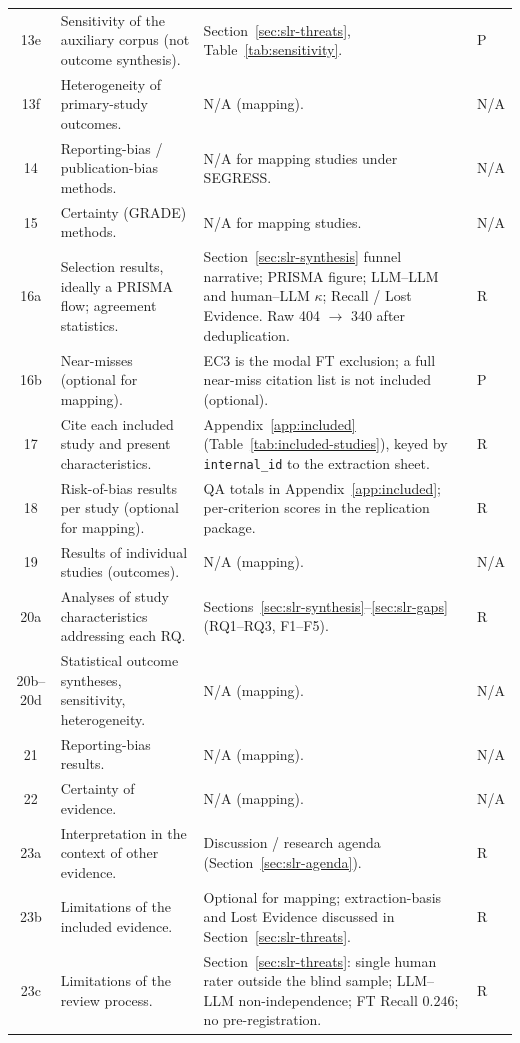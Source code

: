 \begin{longtable}{c p{4.4cm} p{6.6cm} l}
13e & Sensitivity of the auxiliary corpus (not outcome synthesis). & Section~\ref{sec:slr-threats}, Table~\ref{tab:sensitivity}. & P \\
13f & Heterogeneity of primary-study outcomes. & N/A (mapping). & N/A \\
14 & Reporting-bias / publication-bias methods. & N/A for mapping studies under SEGRESS. & N/A \\
15 & Certainty (GRADE) methods. & N/A for mapping studies. & N/A \\
16a & Selection results, ideally a PRISMA flow; agreement statistics. & Section~\ref{sec:slr-synthesis} funnel narrative; PRISMA figure; LLM--LLM and human--LLM $\kappa$; Recall / Lost Evidence. Raw 404 $\rightarrow$ 340 after deduplication. & R \\
16b & Near-misses (optional for mapping). & EC3 is the modal FT exclusion; a full near-miss citation list is not included (optional). & P \\
17 & Cite each included study and present characteristics. & Appendix~\ref{app:included} (Table~\ref{tab:included-studies}), keyed by \texttt{internal\_id} to the extraction sheet. & R \\
18 & Risk-of-bias results per study (optional for mapping). & QA totals in Appendix~\ref{app:included}; per-criterion scores in the replication package. & R \\
19 & Results of individual studies (outcomes). & N/A (mapping). & N/A \\
20a & Analyses of study characteristics addressing each RQ. & Sections~\ref{sec:slr-synthesis}--\ref{sec:slr-gaps} (RQ1--RQ3, F1--F5). & R \\
20b--20d & Statistical outcome syntheses, sensitivity, heterogeneity. & N/A (mapping). & N/A \\
21 & Reporting-bias results. & N/A (mapping). & N/A \\
22 & Certainty of evidence. & N/A (mapping). & N/A \\
23a & Interpretation in the context of other evidence. & Discussion / research agenda (Section~\ref{sec:slr-agenda}). & R \\
23b & Limitations of the included evidence. & Optional for mapping; extraction-basis and Lost Evidence discussed in Section~\ref{sec:slr-threats}. & R \\
23c & Limitations of the review process. & Section~\ref{sec:slr-threats}: single human rater outside the blind sample; LLM--LLM non-independence; FT Recall $0.246$; no pre-registration. & R \\

\end{longtable}
